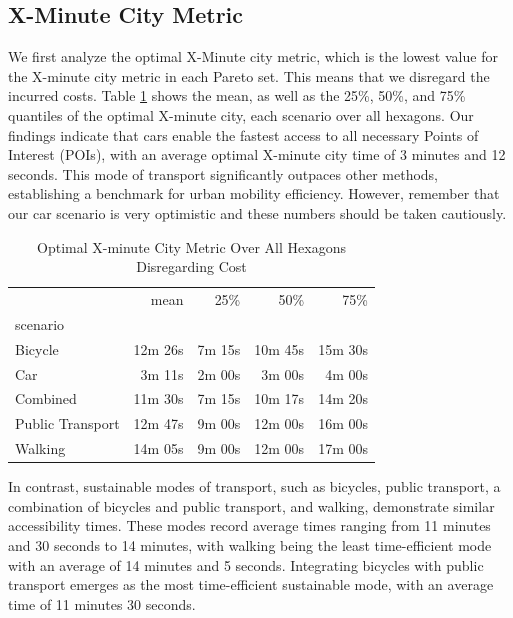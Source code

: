 \subsection{X-Minute City Metric}
\label{subsec:15_minute_city_metric}

We first analyze the optimal X-Minute city metric, which is the lowest value for the X-minute city metric in each Pareto set.
This means that we disregard the incurred costs.
Table \ref{tab:optimal_x_minute_city_metric} shows the mean, as well as the 25\%, 50\%, and 75\% quantiles of the optimal X-minute city, each scenario over all hexagons.
Our findings indicate that cars enable the fastest access to all necessary Points of Interest (POIs), with an average optimal X-minute city time of 3 minutes and 12 seconds. 
This mode of transport significantly outpaces other methods, establishing a benchmark for urban mobility efficiency.
However, remember that our car scenario is very optimistic and these numbers should be taken cautiously.

\begin{table}
  \caption{Optimal X-minute City Metric Over All Hexagons Disregarding Cost}
  \label{tab:optimal_x_minute_city_metric}
  \begin{center}
    \begin{tabular}{lrrrr}
    & mean & 25\% & 50\% & 75\% \\
    scenario &  &  &  &  \\
    Bicycle & 12m 26s & 7m 15s & 10m 45s & 15m 30s \\
    Car & 3m 11s & 2m 00s & 3m 00s & 4m 00s \\
    Combined & 11m 30s & 7m 15s & 10m 17s & 14m 20s \\
    Public Transport & 12m 47s & 9m 00s & 12m 00s & 16m 00s \\
    Walking & 14m 05s & 9m 00s & 12m 00s & 17m 00s \\
    \end{tabular}
  \end{center}
\end{table}

In contrast, sustainable modes of transport, such as bicycles, public transport, a combination of bicycles and public transport, and walking, demonstrate similar accessibility times. 
These modes record average times ranging from 11 minutes and 30 seconds to 14 minutes, with walking being the least time-efficient mode with an average of 14 minutes and 5 seconds. 
Integrating bicycles with public transport emerges as the most time-efficient sustainable mode, with an average time of 11 minutes 30 seconds. 

